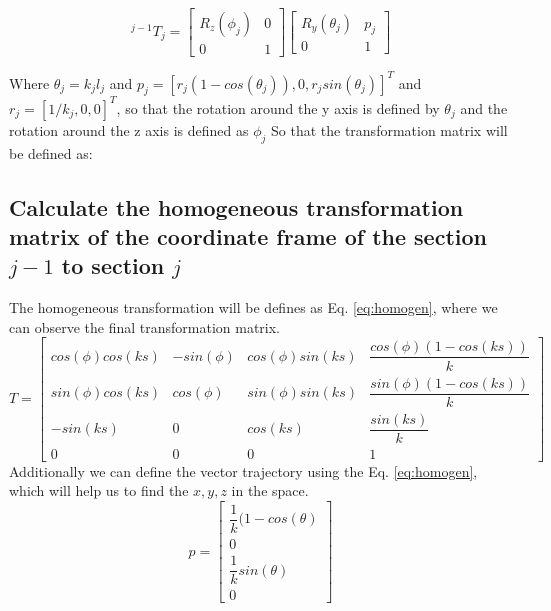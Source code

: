 \documentclass[12pt, twoside]{report}
\begin{document}
\begin{equation}
    ^{j-1} T_{j}=\begin{bmatrix}
        R_{z}(\phi_j) & 0 \\
        0 & 1
    \end{bmatrix} \begin{bmatrix}
        R_{y}(\theta_j) & p_j \\
        0 & 1
    \end{bmatrix} 
    \label{eq:trans1}
\end{equation}

Where $\theta_{j} = k_{j} l_{j}$ and $p_{j}=[r_{j}(1-cos(\theta_j)), 0, r_{j}sin(\theta_j)]^T$ and $r_{j}=[1/k_{j},0,0]^T$, so that the rotation around the y axis is defined by $\theta_j$ and the rotation around the z axis is defined as $\phi_{j}$
So that the transformation matrix will be defined as:\\


\subsection{Calculate the homogeneous transformation matrix of the coordinate frame of the section $j-1$ to section $j$}
The homogeneous transformation will be defines as Eq. \ref{eq:homogen}, where we can observe the final transformation matrix.\\


\begin{equation}
    T=\begin{bmatrix}
        cos(\phi)cos(ks) & -sin(\phi) &cos(\phi) sin(ks)& \dfrac{cos(\phi)(1-cos(ks))}{k}\\
        
        sin(\phi)cos(ks) & cos(\phi) & sin(\phi)sin(ks) &  \dfrac{sin(\phi)(1-cos(ks))}{k}\\
        -sin(ks) & 0 & cos(ks) & \dfrac{sin(ks)}{k}\\
        0 & 0 & 0 & 1
    \end{bmatrix}
    \label{eq:homogen}
\end{equation}
Additionally we can define the vector trajectory using the Eq. \ref{eq:homogen}, which will help us to find the  $x,y,z$ in the space.\\ 
\begin{equation}
    p=\begin{bmatrix}
        \dfrac{1}{k}(1-cos(\theta)\\
        0\\
        \dfrac{1}{k} sin(\theta)\\
        0
    \end{bmatrix}
    \label{eq:traj}
\end{equation}
\end{document}
